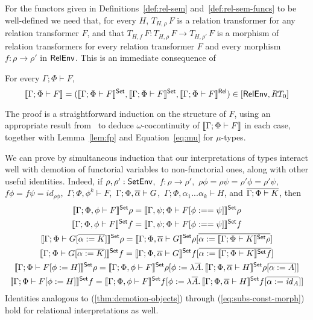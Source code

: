 \documentclass{lmcs}
\theoremstyle{plain}\newtheorem{satz}[thm]{Satz}
\renewcommand{\id}{\mathit{id}}
\begin{document}
For the functors given in Definitions~\ref{def:rel-sem}
and~\ref{def:rel-sem-funcs} to be well-defined we need that, for every
$H$, $T_{H,\rho}\,F$ is a relation transformer for any relation
transformer $F$, and that $T_{H,f}\, F : T_{H,\rho}\, F \to
T_{H,\rho'}\, F$ is a morphism of relation transformers for every
relation transformer $F$ and every morphism $f : \rho \to \rho'$ in
$\mathsf{RelEnv}$. This is an immediate consequence of
\begin{lem}\label{lem:rel-transf-morph}
For every $\Gamma;\Phi \vdash F$,
\[\llbracket{\Gamma;\Phi \vdash F}\rrbracket = (\llbracket{\Gamma;\Phi \vdash F}\rrbracket^{\mathsf{Set}},
\llbracket{\Gamma;\Phi \vdash F}\rrbracket^{\mathsf{Set}},\llbracket{\Gamma;\Phi \vdash F}\rrbracket^{\mathsf{Rel}})
\in[\mathsf{RelEnv},RT_0]\] 
\end{lem}
\noindent
The proof is a straightforward induction on the structure of $F$,
using an appropriate result from~\cite{jp19} to deduce
$\omega$-cocontinuity of $\llbracket{\Gamma;\Phi \vdash F}\rrbracket$ in each case,
together with Lemma~\ref{lem:fp} and Equation~\ref{eq:mu} for
$\mu$-types.

We can prove by simultaneous induction that our interpretations of
types interact well with demotion of functorial variables to
non-functorial ones, along with other useful identities. Indeed, if
$\rho, \rho' : \mathsf{SetEnv}$, \,$f : \rho \to \rho'$, \,$\rho \phi = \rho
\psi = \rho' \phi = \rho' \psi$, \, $f \phi = f \psi = \id_{\rho
  \phi}$,\, $\Gamma; \Phi, \phi^k \vdash F$,\,
$\Gamma;\Phi,\overline{\alpha} \vdash G$,\, $\Gamma;\Phi,\alpha_1...\alpha_k
\vdash H$, and $\overline{\Gamma;\Phi \vdash K}$, then
\begin{gather}
\label{thm:demotion-objects}
\setsem{\Gamma; \Phi, \phi \vdash F} \rho = \setsem{\Gamma, \psi; \Phi
  \vdash F[\phi :== \psi] } \rho\\
\label{thm:demotion-morphisms}
\setsem{\Gamma; \Phi, \phi \vdash F} f = \setsem{\Gamma, \psi; \Phi
  \vdash F[\phi :== \psi]} f\\
\label{eq:subs-var}
\setsem{\Gamma;\Phi \vdash G[\ol{\alpha := K}]}\rho =
\setsem{\Gamma;\Phi,\ol{\alpha} \vdash G}\rho[\ol{\alpha := 
\setsem{\Gamma;\Phi \vdash K}\rho}]\\
\label{eq:subs-var-morph}
\setsem{\Gamma;\Phi \vdash G[\ol{\alpha := K}]}f =
\setsem{\Gamma;\Phi,\ol{\alpha} \vdash G}f[\ol{\alpha :=
\setsem{\Gamma;\Phi \vdash K}f}]\\
\label{eq:subs-const}
\setsem{\Gamma; \Phi \vdash F[\phi := H]}\rho
= \setsem{\Gamma; \Phi, \phi \vdash F}\rho
[\phi := \lambda \ol{A}.\, \setsem{\Gamma;\Phi,\overline{\alpha}\vdash
    H}\rho[\overline{\alpha := A}]] \\ 
\label{eq:subs-const-morph}
\setsem{\Gamma; \Phi \vdash F[\phi := H]}f
= \setsem{\Gamma; \Phi, \phi \vdash F}f
[\phi := \lambda \ol{A}.\,\setsem{\Gamma;\Phi,\overline{\alpha}\vdash
    H}f[\overline{\alpha := \id_A}]] 
\end{gather}
Identities analogous to (\ref{thm:demotion-objects}) through
(\ref{eq:subs-const-morph}) hold for relational interpretations as well.
\end{document}
